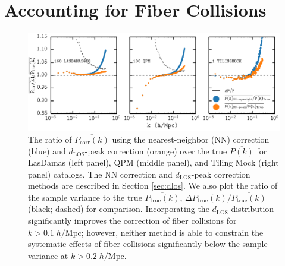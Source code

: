 \documentclass{emulateapj}
\begin{document}
\section{Accounting for Fiber Collisions} \label{sec:fc_corr}
\begin{figure}
\begin{center}
\includegraphics[scale=0.55]{fcpaper_pk_peakonly_comp.png} 
\caption{The ratio of $\overline{P_\mathrm{corr} (k)}$ using the nearest-neighbor (NN) correction (blue) and $d_\mathrm{LOS}$-peak correction (orange) over the true $\overline{P(k)}$ for LasDamas (left panel), QPM (middle panel), and Tiling Mock (right panel) catalogs. The NN correction and $d_\mathrm{LOS}$-peak correction methods are described in Section \ref{sec:dlos}. We also plot the ratio of the sample variance to the true $\overline{P_\mathrm{true}(k)}$, $\Delta P_\mathrm{true}(k) / \overline{P_\mathrm{true}(k)}$ (black; dashed) for comparison. Incorporating the $d_{\mathrm{LOS}}$ distribution significantly improves the correction of fiber collisions for $k > 0.1 \; h/\mathrm{Mpc}$; however, neither method is able to constrain the systematic effects of fiber collisions significantly below the sample variance at $k > 0.2 \; h/\mathrm{Mpc}$.}\label{fig:fc_pk}
\end{center}
\end{figure}
\end{document}
